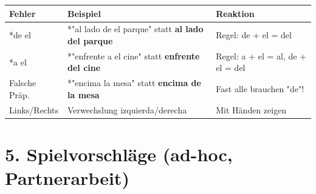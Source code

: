 \documentclass[11pt, a4paper]{article}
\newcommand{\fachfarbe}{spanisch}
\newcommand{\es}[1]{\textcolor{\fachfarbe}{\textbf{#1}}}
\begin{document}
\begin{fehlerbox}
\begin{tabularx}{\textwidth}{|l|X|X|}
\hline
\textbf{Fehler} & \textbf{Beispiel} & \textbf{Reaktion} \\
\hline
*de el & *"al lado de el parque" statt \es{al lado del parque} & Regel: de + el = del \\
\hline
*a el & *"enfrente a el cine" statt \es{enfrente del cine} & Regel: a + el = al, de + el = del \\
\hline
Falsche Präp. & *"encima la mesa" statt \es{encima de la mesa} & Fast alle brauchen "de"! \\
\hline
Links/Rechts & Verwechslung izquierda/derecha & Mit Händen zeigen \\
\hline
\end{tabularx}
\end{fehlerbox}


\section*{5. Spielvorschläge (ad-hoc, Partnerarbeit)}
\end{document}

